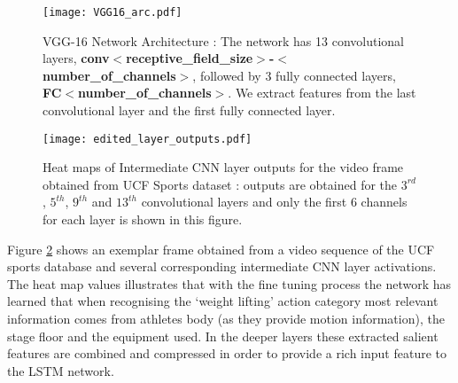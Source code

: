 \documentclass[10pt,twocolumn,letterpaper]{article}
\begin{document}
    \begin{figure}[h]
        \begin{flushleft}
        	\texttt{[image: VGG16\_arc.pdf]}
	\caption{ VGG-16 Network \cite{VGG16}  Architecture : The network has 13 convolutional layers, \textbf{conv$<$receptive\_field\_size$>$-$<$number\_of\_channels$>$}, followed by 3 fully connected layers, \textbf{FC\-$<$number\_of\_channels$>$}. We extract features from the last convolutional layer and the first fully connected layer.}
	\label{fig:vgg16}
        \end{flushleft}
        \vspace{-2 mm}
  \end{figure}

       
    
   \begin{figure}[h]
        \begin{flushleft}
        	\texttt{[image: edited\_layer\_outputs.pdf]}
	\caption{Heat maps of Intermediate CNN layer outputs for the video frame obtained from UCF Sports dataset :  outputs are obtained for the $3^{rd}$, $5^{th}$, $9^{th}$ and $13^{th}$ convolutional layers and only the first 6 channels for each layer is shown in this figure. }
	\label{fig:intermid}
        \end{flushleft}
        \vspace{-7 mm}
  \end{figure}


   Figure \ref{fig:intermid} shows an exemplar frame obtained from a video sequence of the UCF sports database and several corresponding intermediate CNN layer activations. The heat map values illustrates that with the fine tuning process the network has learned that when recognising the `weight lifting' action category most relevant information comes from athletes body (as they provide motion information), the stage floor and the equipment used. In the deeper layers these extracted salient features are combined and compressed in order to provide a rich input feature to the LSTM network.
   
   
\end{document}
